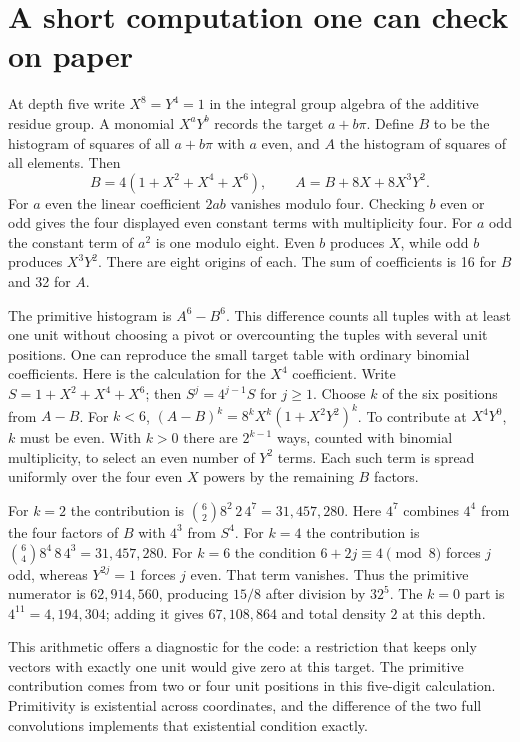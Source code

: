 \documentclass[12pt,letterpaper]{article}
\begin{document}
\section{A short computation one can check on paper}
At depth five write $X^8=Y^4=1$ in the integral group algebra of the additive residue group. A monomial $X^aY^b$ records the target $a+b\pi$. Define $B$ to be the histogram of squares of all $a+b\pi$ with $a$ even, and $A$ the histogram of squares of all elements. Then
\[
 B=4(1+X^2+X^4+X^6),\qquad A=B+8X+8X^3Y^2.
\]
For $a$ even the linear coefficient $2ab$ vanishes modulo four. Checking $b$ even or odd gives the four displayed even constant terms with multiplicity four. For $a$ odd the constant term of $a^2$ is one modulo eight. Even $b$ produces $X$, while odd $b$ produces $X^3Y^2$. There are eight origins of each. The sum of coefficients is 16 for $B$ and 32 for $A$.
\par
The primitive histogram is $A^6-B^6$. This difference counts all tuples with at least one unit without choosing a pivot or overcounting the tuples with several unit positions. One can reproduce the small target table with ordinary binomial coefficients. Here is the calculation for the $X^4$ coefficient. Write $S=1+X^2+X^4+X^6$; then $S^j=4^{j-1}S$ for $j\ge1$. Choose $k$ of the six positions from $A-B$. For $k<6$, $(A-B)^k=8^kX^k(1+X^2Y^2)^k$. To contribute at $X^4Y^0$, $k$ must be even. With $k>0$ there are $2^{k-1}$ ways, counted with binomial multiplicity, to select an even number of $Y^2$ terms. Each such term is spread uniformly over the four even $X$ powers by the remaining $B$ factors.
\par
For $k=2$ the contribution is $\binom62 8^2\,2\,4^{7}=31{,}457{,}280$. Here $4^7$ combines $4^4$ from the four factors of $B$ with $4^3$ from $S^4$. For $k=4$ the contribution is $\binom64 8^4\,8\,4^3=31{,}457{,}280$. For $k=6$ the condition $6+2j\equiv4\pmod8$ forces $j$ odd, whereas $Y^{2j}=1$ forces $j$ even. That term vanishes. Thus the primitive numerator is $62{,}914{,}560$, producing $15/8$ after division by $32^5$. The $k=0$ part is $4^{11}=4{,}194{,}304$; adding it gives $67{,}108{,}864$ and total density $2$ at this depth.
\par
This arithmetic offers a diagnostic for the code: a restriction that keeps only vectors with exactly one unit would give zero at this target. The primitive contribution comes from two or four unit positions in this five-digit calculation. Primitivity is existential across coordinates, and the difference of the two full convolutions implements that existential condition exactly.
\end{document}
